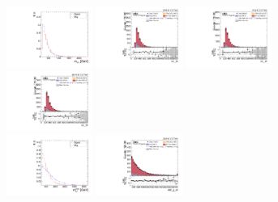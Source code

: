 \begin{figure}[!ht]
  \centering
  \includegraphics[width=0.25\textwidth]{analysis_plots/tmva_plots/zjj_BDTG14_dibos_m.pdf} \hspace{-10pt}
  \includegraphics[width=0.25\textwidth]{analysis_plots/2016_zjj/cr_vjets_l/vv_m.pdf} \hspace{-10pt}
  \includegraphics[width=0.25\textwidth]{analysis_plots/2017_zjj/cr_vjets_l/vv_m.pdf} \hspace{-10pt}
  \includegraphics[width=0.25\textwidth]{analysis_plots/2018_zjj/cr_vjets_l/vv_m.pdf} \hspace{-10pt}  \\
  \includegraphics[width=0.25\textwidth]{analysis_plots/tmva_plots/zjj_BDTG14_vbf_m.pdf} \hspace{-10pt}
  \includegraphics[width=0.25\textwidth]{analysis_plots/2016_zjj/cr_vjets_l/vbf_jj_m.pdf} \hspace{-10pt}

\end{figure}
